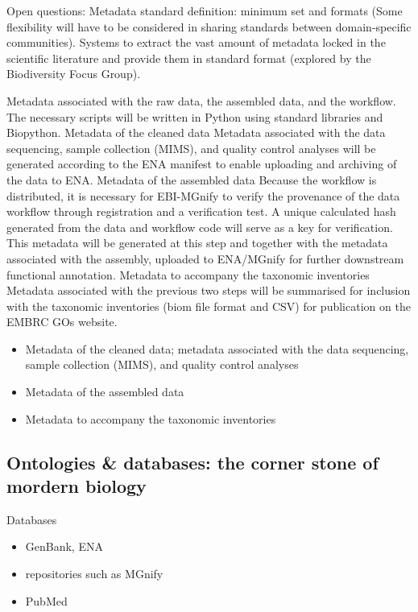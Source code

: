    Open questions: 
   Metadata standard definition: minimum set and formats (Some flexibility will have to be considered in sharing standards between domain-specific communities).
   Systems to extract the vast amount of metadata locked in the scientific literature and provide them in standard format (explored by the Biodiversity Focus Group).


   Metadata associated with the raw data, the assembled data, and the workflow. The necessary scripts will be written in Python using standard libraries and Biopython. 
   Metadata of the cleaned data
   Metadata associated with the data sequencing, sample collection (MIMS), and quality control analyses will be generated according to the ENA manifest to enable uploading and archiving of the data to ENA.
   Metadata of the assembled data
   Because the workflow is distributed, it is necessary for EBI-MGnify to verify the provenance of the data workflow through registration and a verification test. A unique calculated hash generated from the data and workflow code will serve as a key for verification. This metadata will be generated at this step and together with the metadata associated with the assembly, uploaded to ENA/MGnify for further downstream functional annotation.
   Metadata to accompany the taxonomic inventories
   Metadata associated with the previous two steps will be summarised for inclusion with the taxonomic inventories (biom file format and CSV) for publication on the EMBRC GOs website.


   \begin{itemize}
      \item Metadata of the cleaned data; metadata associated with the data sequencing, sample collection (MIMS), and quality control analyses
      \item Metadata of the assembled data
      \item Metadata to accompany the taxonomic inventories

   \end{itemize}  




\subsection{Ontologies \& databases: the corner stone of mordern biology}


   Databases

   \begin{itemize}
      \item GenBank, ENA
      \item repositories such as MGnify 
      \item PubMed
   \end{itemize}


